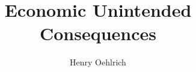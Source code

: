 \documentclass{article}
\author{Henry Oehlrich}
\title{Economic Unintended Consequences}
\begin{document}
\maketitle

\autocite{merton1936}
\autocite{hayek1945}
\autocite{econlib2023}

\newpage
\printbibliography
\end{document}
